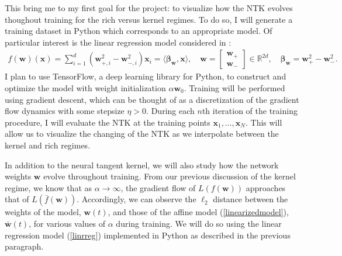 \documentclass{article}
\begin{document}
This bring me to my first goal for the project: to visualize how the NTK evolves thoughout training for the rich versus kernel regimes. To do so, I will generate a training dataset in Python which corresponds to an appropriate model. Of particular interest is the linear regression model considered in \cite{woodworth2020kernel}:
\begin{align}\label{linrreg}
    f(\boldsymbol{w})(\boldsymbol{x}) = \sum_{i=1}^d (\boldsymbol{w}_{+, i}^2 - \boldsymbol{w}_{-, i}^2)\boldsymbol{x}_i = \langle \boldsymbol{\beta}_{\boldsymbol{w}}, \boldsymbol{x} \rangle, \quad \boldsymbol{w} = \begin{bmatrix}
                        \boldsymbol{w}_+ \\
                        \boldsymbol{w}_-
                        \end{bmatrix} \in \mathbb{R}^{2d},
    \quad \boldsymbol{\beta}_{\boldsymbol{w}} = \boldsymbol{w}_+^2 - \boldsymbol{w}_-^2.
\end{align}
I plan to use TensorFlow, a deep learning library for Python, to construct and optimize the model with weight initialization $\alpha \boldsymbol{w}_0$. Training will be performed using gradient descent, which can be thought of as a discretization of the gradient flow dynamics with some stepsize $\eta > 0$. During each $n$th iteration of the training procedure, I will evaluate the NTK at the training points $\boldsymbol{x}_1, \ldots, \boldsymbol{x}_N$. This will allow us to visualize the changing of the NTK as we interpolate between the kernel and rich regimes.

In addition to the neural tangent kernel, we will also study how the network weights $\boldsymbol{w}$ evolve throughout training. From our previous discussion of the kernel regime, we know that as $\alpha \rightarrow \infty$, the gradient flow of $L(f(\boldsymbol{w}))$ approaches that of $L(\bar{f}(\boldsymbol{w}))$. Accordingly, we can observe the $\ell_2$ distance between the weights of the model, $\boldsymbol{w}(t)$, and those of the affine model (\ref{linearizedmodel}), $\bar{\boldsymbol{w}}(t)$, for various values of $\alpha$ during training. We will do so using the linear regression model (\ref{linrreg}) implemented in Python as described in the previous paragraph.
\end{document}
